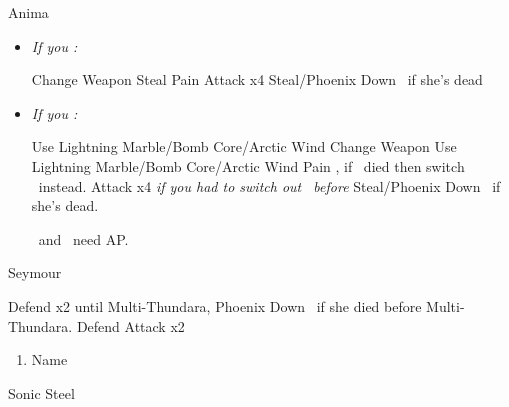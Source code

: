 \vfill
\begin{battle}[18000]{Anima}
	\begin{itemize}
		\item \textit{If you \wonblitz:}
		      \begin{itemize}
			      \switch{\tidus}{\wakka}
			      \wakkaf Change Weapon
			      \kimahrif Steal
			      \enemyf Pain
			      \tidusf Attack x4
			      \rikkuf Steal/Phoenix Down \yuna\ if she's dead
		      \end{itemize}
		\item \textit{If you \lostblitz:}
		      \begin{itemize}
			      \rikkuf Use Lightning Marble/Bomb Core/Arctic Wind
			      \switch{\tidus}{\wakka}
			      \wakkaf Change Weapon
			      \kimahrif Use Lightning Marble/Bomb Core/Arctic Wind
			      \enemyf Pain
			      \switch{\wakka}{\tidus}, if \wakka\ died then switch \rikku\ instead.
			      \tidusf Attack x4
			      \switch{\kimahri}{\rikku} \textit{if you had to switch out \rikku\ before}
			      \rikkuf Steal/Phoenix Down \yuna\ if she's dead.
		      \end{itemize}
		      \tidus\ and \yuna\ need AP.
	\end{itemize}
\end{battle}
\begin{battle}[6000]{Seymour}
	\begin{itemize}
		\tidusf Defend x2 until Multi-Thundara, Phoenix Down \rikku\ if she died before Multi-Thundara.
	      \rikkuf Defend
	      \tidusf Attack x2
	\end{itemize}
\end{battle}
\begin{enumerate}[resume]
	\item Name \shiva
\end{enumerate}
\begin{equip}
	\begin{itemize}
		\tidusf Sonic Steel
	\end{itemize}
\end{equip}

